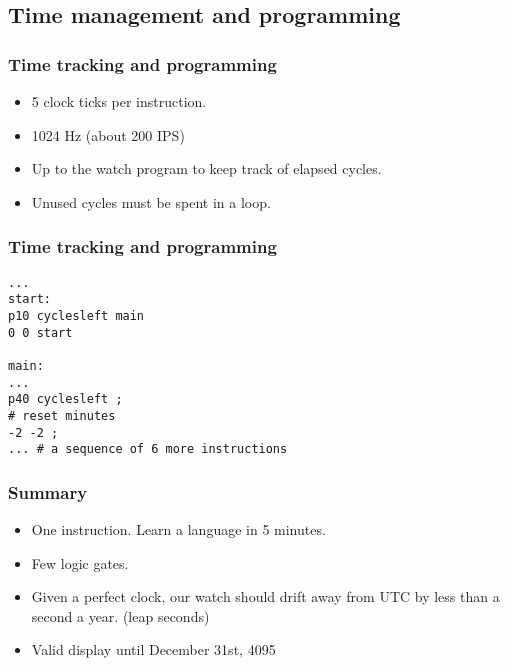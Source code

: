 \documentclass{beamer}
\begin{document}
\subsection{Time management and programming}
\begin{frame}
  \frametitle{Time tracking and programming}
  \begin{itemize}
    \item 5 clock ticks per instruction.
    \item 1024 Hz (about 200 IPS)
    \item<2-> Up to the watch program to keep track of elapsed cycles.
    \item<3-> Unused cycles must be spent in a loop.
  \end{itemize}
\end{frame}

\begin{frame}[fragile]
  \frametitle{Time tracking and programming}
    \begin{verbatim}
...
start:
p10 cyclesleft main
0 0 start

main:
...
p40 cyclesleft ;
# reset minutes
-2 -2 ;
... # a sequence of 6 more instructions
    \end{verbatim}
\end{frame}

\begin{frame}
  \frametitle{Summary}
  \begin{itemize}
    \item One instruction. Learn a language in 5 minutes.
    \item<2-> Few logic gates. %
    \item<3-> Given a perfect clock, our watch should drift away from UTC
      by less than a second a year. (leap seconds)
    \item<4-> Valid display until December 31st, 4095
  \end{itemize}
\end{frame}
\end{document}
